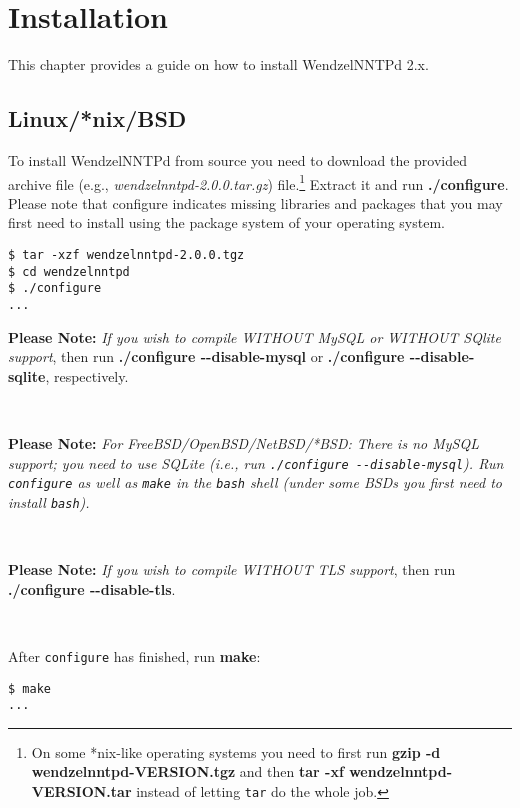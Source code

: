 \chapter{Installation}

This chapter provides a guide on how to install WendzelNNTPd 2.x.

\section{Linux/*nix/BSD}

To install WendzelNNTPd from source you need to download the provided archive file (e.g., \emph{wendzelnntpd-2.0.0.tar.gz}) file.\footnote{On some *nix-like operating systems you need to first run \textbf{gzip -d wendzelnntpd-VERSION.tgz} and then \textbf{tar -xf wendzelnntpd-VERSION.tar} instead of letting \texttt{tar} do the whole job.} Extract it and run \textbf{./configure}. Please note that configure indicates missing libraries and packages that you may first need to install using the package system of your operating system.

\begin{verbatim}
$ tar -xzf wendzelnntpd-2.0.0.tgz
$ cd wendzelnntpd
$ ./configure
...
\end{verbatim}

\textbf{Please Note:} \textit{If you wish to compile WITHOUT MySQL or WITHOUT SQlite support}, then run \textbf{./configure -{}-disable-mysql} or \textbf{./configure -{}-disable-sqlite}, respectively.

~

\textbf{Please Note:} \textit{For FreeBSD/OpenBSD/NetBSD/*BSD: There is no MySQL support; you need to use SQLite (i.e., run \texttt{./configure -{}-disable-mysql}). Run \texttt{configure} as well as \texttt{make} in the \texttt{bash} shell (under some BSDs you first need to install \texttt{bash}).}

~

\textbf{Please Note:} \textit{If you wish to compile WITHOUT TLS support}, then run \textbf{./configure -{}-disable-tls}.

~

After \texttt{configure} has finished, run \textbf{make}:

\begin{verbatim}
$ make
...
\end{verbatim}


